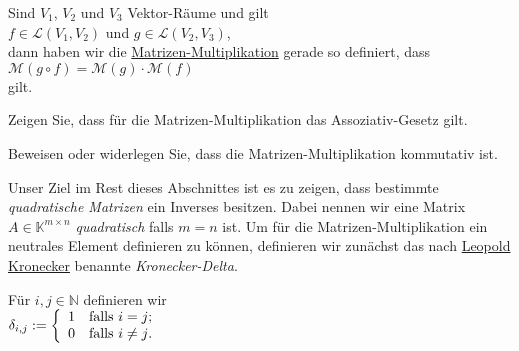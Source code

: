 \remark
Sind $V_1$, $V_2$ und $V_3$ Vektor-R\"{a}ume und gilt
\\[0.2cm]
\hspace*{1.3cm}
 $f \in \mathcal{L}(V_1, V_2)$ und $g \in \mathcal{L}(V_2, V_3)$,
\\[0.2cm]
dann haben wir die 
\href{http://de.wikipedia.org/wiki/Matrizenmultiplikation}{Matrizen-Multiplikation} gerade so definiert, dass
\\[0.2cm]
\hspace*{1.3cm}
$\mathcal{M}(g \circ f) = \mathcal{M}(g) \cdot \mathcal{M}(f)$
\\[0.2cm]
gilt.  \eoxs

\exercise
Zeigen Sie, dass f\"{u}r die Matrizen-Multiplikation das Assoziativ-Gesetz gilt.
\eoxs

\exercise
Beweisen oder widerlegen Sie, dass die Matrizen-Multiplikation kommutativ ist.
\eox

Unser Ziel im Rest dieses Abschnittes ist es zu zeigen, dass bestimmte \emph{quadratische Matrizen} ein
Inverses besitzen.  Dabei nennen wir eine Matrix $A \in \mathbb{K}^{m \times n}$ \emph{quadratisch}
falls $m = n$ ist.  Um f\"{u}r die Matrizen-Multiplikation ein neutrales Element definieren zu k\"{o}nnen,
definieren wir zun\"{a}chst das nach 
\href{http://de.wikipedia.org/wiki/Leopold_Kronecker}{Leopold Kronecker} benannte \emph{Kronecker-Delta}.


\begin{Definition}
  F\"{u}r $i,j \in \mathbb{N}$ definieren wir
  \\[0.2cm]
  \hspace*{1.3cm}
  $\delta_{i,j} := \left\{
                  \begin{array}[c]{ll}
                    1 & \mbox{falls $i = j$;} \\
                    0 & \mbox{falls $i \not= j$}.
                  \end{array}
                  \right.
  $
\eoxs
\end{Definition}

